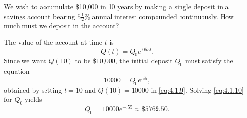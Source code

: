 \setcounter{example}{2}
\begin{example}
  \label{example:4.1.3} \rm We wish to accumulate \$10,000 in 10 years by making a single deposit in
  a savings account bearing $5{\frac{1}{2}}$\% annual interest compounded continuously. How much
  must we deposit in the account?
\end{example}
\setcounter{equation}{8}
\begin{examplesolution}
\solution The value of the account at time $t$ is
\begin{equation}
  \label{eq:4.1.9}Q(t)=Q_{0}e^{.055t}.
\end{equation}
Since we want $Q(10)$ to be \$10,000, the initial deposit $Q_{0}$ must satisfy the equation
\begin{equation}
  \label{eq:4.1.10}10000=Q_{0}e^{.55},
\end{equation}
obtained by setting $t=10$ and $Q(10)=10000$ in \eqref{eq:4.1.9}. Solving \eqref{eq:4.1.10} for
$Q_{0}$ yields
\[
  Q_{0}=10000e^{-.55}\approx\$5769.50.
\]
\end{examplesolution}

